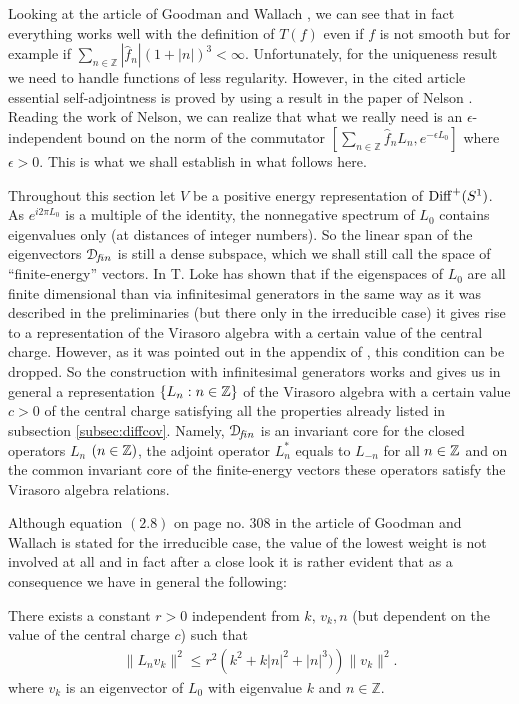 \documentclass[12pt]{article}
\begin{document}
Looking at the article of Goodman and Wallach \cite{GoWa}, we can see that
in fact everything works well with the definition of $T(f)$ even if $f$ is
not smooth but for example if $\mathop{\sum}_{n \in {\mathbb
Z}}|\hat{f}_n|(1+|n|)^3 < \infty$. Unfortunately, for the uniqueness
result we need to handle functions of less regularity. However, in the
cited article essential self-adjointness is proved by using a result in the 
paper of Nelson \cite{Ne}. Reading the work of  Nelson, we can realize
that what we really need is an $\epsilon$-independent bound on the norm
of the commutator $[\mathop{\sum}_{n \in {\mathbb Z}}\hat{f}_n L_n,
e^{-\epsilon L_0}]$ where $\epsilon > 0$. This is what we shall establish
in what follows here.

Throughout this section let $V$ be a positive energy 
representation of ${{\rm Diff}^+(S^1)}$. As $e^{i2\pi L_0}$ is a multiple of
the identity, the nonnegative spectrum of $L_0$ contains eigenvalues only
(at distances of integer numbers). So the linear span of the eigenvectors
${\mathcal D}\!_{f\!in}$ is still a dense subspace, which we shall still call the space of
``finite-energy'' vectors. In \cite[Chapt. 1]{loke} T. Loke has shown 
that if the eigenspaces of $L_0$ are all finite dimensional than via
infinitesimal generators in the same way as it was described in the
preliminaries (but there only in the irreducible case) it gives rise to
a representation of the Virasoro algebra with a certain value of the
central charge. However, as it was pointed out in the appendix of 
\cite{Carpi03b}, this condition can be dropped. 
So the construction with infinitesimal generators works and gives us in
general a representation $\{L_n: n \in {\mathbb Z} \}$ of the Virasoro algebra
with a certain value $c>0$ of the central charge satisfying
all the properties already listed in subsection \ref{subsec:diffcov}. 
Namely, ${\mathcal D}\!_{f\!in}$ is an invariant core for the closed operators $L_n$ $(n \in
{\mathbb Z})$, the adjoint operator $L_n^*$ equals to $L_{-n}$ for all $n \in {\mathbb Z}$
and on the common invariant core of the finite-energy vectors these
operators satisfy the Virasoro algebra relations.

Although equation $(2.8)$ on page no. $308$ in the article of
Goodman and Wallach \cite{GoWa} is stated for the irreducible case,
the value of the lowest weight is not involved at all and in fact
after a close look it is rather evident that as a consequence we
have in general the following:
\begin{lemma}
\label{estimate}
There exists a constant $r > 0$ independent from $k,\,v_k,n$ (but
dependent on the value of the central charge $c$) such that  
\begin{eqnarray*}
\| L_n v_k \|^2 \leq 
r^2 \left( k^2+k|n|^2+|n|^3) \right) \|v_k\|^2.
\end{eqnarray*}
where $v_k$ is an eigenvector of $L_0$ with eigenvalue
$k$ and $n \in {\mathbb Z}$. 
\end{lemma}
\end{document}
